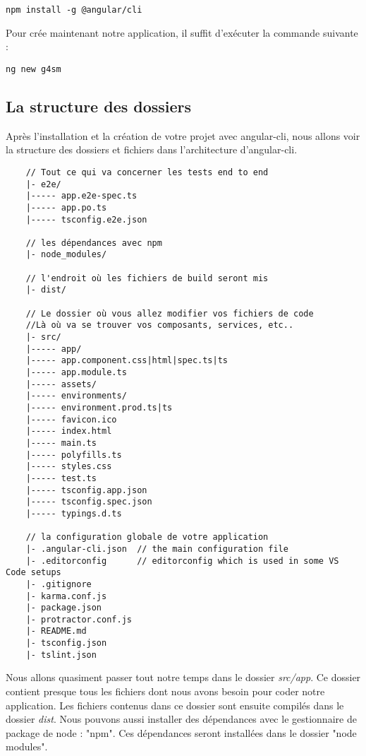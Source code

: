 \begin{verbatim}
npm install -g @angular/cli
\end{verbatim}

Pour crée maintenant notre application, il suffit d'exécuter la commande suivante :

\begin{verbatim}
ng new g4sm
\end{verbatim}

\subsection{La structure des dossiers}
Après l'installation et la création de votre projet avec angular-cli, nous allons voir la structure des dossiers et fichiers dans l'architecture d'angular-cli.

\begin{verbatim}
	// Tout ce qui va concerner les tests end to end
	|- e2e/
	|----- app.e2e-spec.ts
	|----- app.po.ts
	|----- tsconfig.e2e.json
	
	// les dépendances avec npm
	|- node_modules/
	
	// l'endroit où les fichiers de build seront mis
	|- dist/
	
	// Le dossier où vous allez modifier vos fichiers de code
	//Là où va se trouver vos composants, services, etc..
	|- src/
	|----- app/
	|----- app.component.css|html|spec.ts|ts
	|----- app.module.ts
	|----- assets/
	|----- environments/
	|----- environment.prod.ts|ts
	|----- favicon.ico
	|----- index.html
	|----- main.ts
	|----- polyfills.ts
	|----- styles.css
	|----- test.ts
	|----- tsconfig.app.json
	|----- tsconfig.spec.json
	|----- typings.d.ts
	
	// la configuration globale de votre application
	|- .angular-cli.json  // the main configuration file
	|- .editorconfig      // editorconfig which is used in some VS Code setups
	|- .gitignore
	|- karma.conf.js
	|- package.json
	|- protractor.conf.js
	|- README.md
	|- tsconfig.json
	|- tslint.json
\end{verbatim}

Nous allons quasiment passer tout notre temps dans le dossier \emph{src/app}. Ce dossier contient presque tous les fichiers dont nous avons besoin pour coder notre application. Les fichiers contenus dans ce dossier sont ensuite compilés dans le dossier \emph{dist}.  Nous pouvons aussi installer des dépendances avec le gestionnaire de package de node : "npm". Ces dépendances seront installées dans le dossier "node modules".

